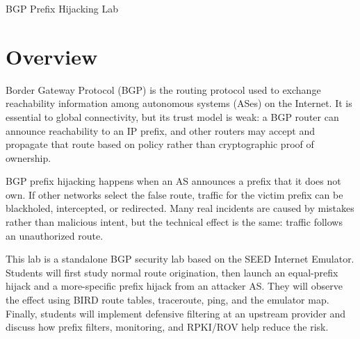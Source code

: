 
\newcommand{\commonfolder}{../../../common-files}







\begin{center}
{\LARGE BGP Prefix Hijacking Lab}
\end{center}



\section{Overview}

Border Gateway Protocol (BGP) is the routing protocol used to exchange
reachability information among autonomous systems (ASes) on the Internet. It is
essential to global connectivity, but its trust model is weak: a BGP router can
announce reachability to an IP prefix, and other routers may accept and
propagate that route based on policy rather than cryptographic proof of
ownership.

BGP prefix hijacking happens when an AS announces a prefix that it does not
own. If other networks select the false route, traffic for the victim prefix can
be blackholed, intercepted, or redirected. Many real incidents are caused by
mistakes rather than malicious intent, but the technical effect is the same:
traffic follows an unauthorized route.

This lab is a standalone BGP security lab based on the SEED Internet Emulator.
Students will first study normal route origination, then launch an equal-prefix
hijack and a more-specific prefix hijack from an attacker AS. They will observe
the effect using BIRD route tables, traceroute, ping, and the emulator map.
Finally, students will implement defensive filtering at an upstream provider
and discuss how prefix filters, monitoring, and RPKI/ROV help reduce the risk.

